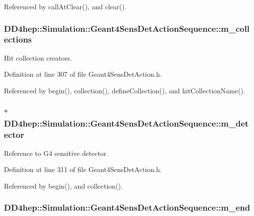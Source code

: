 Referenced by callAtClear(), and clear().\hypertarget{class_d_d4hep_1_1_simulation_1_1_geant4_sens_det_action_sequence_a58c74511f9bef97e83b5a7e54b4917ca}{
\subsubsection[{m\_\-collections}]{ {\bf DD4hep::Simulation::Geant4SensDetActionSequence::m\_\-collections}}}
\label{class_d_d4hep_1_1_simulation_1_1_geant4_sens_det_action_sequence_a58c74511f9bef97e83b5a7e54b4917ca}


Hit collection creators. 

Definition at line 307 of file Geant4SensDetAction.h.

Referenced by begin(), collection(), defineCollection(), and hitCollectionName().\hypertarget{class_d_d4hep_1_1_simulation_1_1_geant4_sens_det_action_sequence_a4c35959bba4b7d3f05a8aa48970be68a}{
\subsubsection[{m\_\-detector}]{$\ast$ {\bf DD4hep::Simulation::Geant4SensDetActionSequence::m\_\-detector}}}
\label{class_d_d4hep_1_1_simulation_1_1_geant4_sens_det_action_sequence_a4c35959bba4b7d3f05a8aa48970be68a}


Reference to G4 sensitive detector. 

Definition at line 311 of file Geant4SensDetAction.h.

Referenced by begin(), and collection().\hypertarget{class_d_d4hep_1_1_simulation_1_1_geant4_sens_det_action_sequence_a15a09899c6ec50b8d14f4543362d9c91}{
\subsubsection[{m\_\-end}]{ {\bf DD4hep::Simulation::Geant4SensDetActionSequence::m\_\-end}}}
\label{class_d_d4hep_1_1_simulation_1_1_geant4_sens_det_action_sequence_a15a09899c6ec50b8d14f4543362d9c91}



